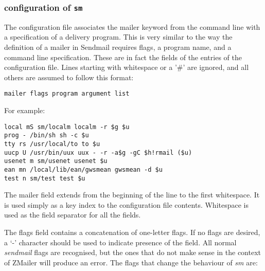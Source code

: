 \subsubsection{configuration of \tt sm}
\label{smconfig}

The configuration file associates the mailer keyword from
the command line with a specification of a delivery program. 
This is very similar to the way the definition of a
mailer in Sendmail requires flags, a program name, and a
command line specification. These are in fact the fields
of the entries of the configuration file. Lines starting
with whitespace or a '\#' are ignored, and all others are
assumed to follow this format:

\begin{verbatim}
mailer flags program argument list
\end{verbatim}

For example:
\begin{verbatim}
local mS sm/localm localm -r $g $u
prog - /bin/sh sh -c $u
tty rs /usr/local/to to $u
uucp U /usr/bin/uux uux - -r -a$g -gC $h!rmail ($u)
usenet m sm/usenet usenet $u
ean mn /local/lib/ean/gwsmean gwsmean -d $u
test n sm/test test $u
\end{verbatim}


The mailer field extends from the beginning of the line to
the first whitespace. It is used simply as a key index to
the configuration file contents. Whitespace is used as
the field separator for all the fields.

The flags field contains a concatenation of one-letter
flags. If no flags are desired, a `-' character should be
used to indicate presence of the field. All normal {\em sendmail} flags 
are recognised, but the ones that do not make
sense in the context of ZMailer will produce an error.
The flags that change the behaviour of {\em sm} are:

